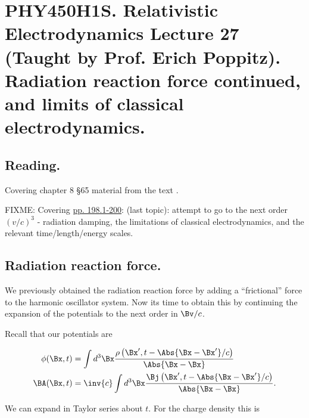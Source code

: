 
%

\chapter{PHY450H1S.  Relativistic Electrodynamics Lecture 27 (Taught by Prof. Erich Poppitz).  Radiation reaction force continued, and limits of classical electrodynamics.}
\label{chap:relativisticElectrodynamicsL27}
{}
\date{April 6, 2011}

\beginArtNoToc

\section{Reading.}

Covering chapter 8 \S 65 material from the text \cite{landau1980classical}.

FIXME: Covering \href{http://www.physics.utoronto.ca/~poppitz/epoppitz/PHY450_files/RelEMpp181-195.pdf}{pp. 198.1-200}: (last topic): attempt to go to the next order $(v/c)^3$ - radiation damping, the limitations of classical electrodynamics, and the relevant time/length/energy scales.

\section{Radiation reaction force.}

We previously obtained the radiation reaction force by adding a ``frictional'' force to the harmonic oscillator system.  Now its time to obtain this by continuing the expansion of the potentials to the next order in $\Bv/c$.

Recall that our potentials are

\begin{align}\label{eqn:relativisticElectrodynamicsL27:10}
\phi(\Bx, t) &= \int d^3 \Bx \frac{\rho\left(\Bx', t - \Abs{\Bx - \Bx'}/c\right)}{\Abs{\Bx - \Bx}} \\
\BA(\Bx, t) &= \inv{c}\int d^3 \Bx \frac{\Bj\left(\Bx', t - \Abs{\Bx - \Bx'}/c\right)}{\Abs{\Bx - \Bx}}.
\end{align}

We can expand in Taylor series about $t$.  For the charge density this is


